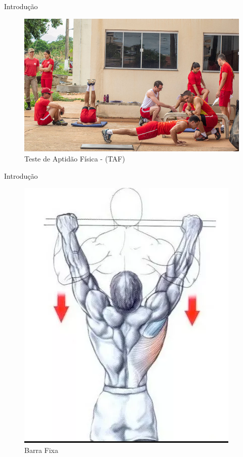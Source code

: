 

\begin{frame}{Introdução}

    \begin{figure}[!ht]
        \centering %
          \includegraphics[scale=0.5]{img/intro/taf.jpeg}
         \caption{Teste de Aptidão Física - (TAF)}
    \end{figure}

\end{frame}


\begin{frame}{Introdução}

    \begin{figure}[!ht]
        \centering %
          \includegraphics[scale=0.35]{img/intro/barra_fixa.png}
         \caption{Barra Fixa}
    \end{figure}

\end{frame}


